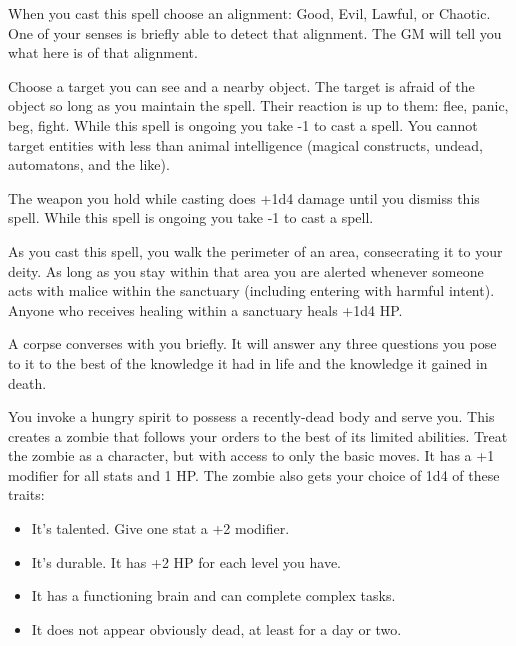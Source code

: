 
When you cast this spell choose an alignment: Good, Evil, Lawful, or Chaotic. One of your senses is briefly able to detect that alignment. The GM will tell you what here is of that alignment.

\newpage
{}


Choose a target you can see and a nearby object. The target is afraid of the object so long as you maintain the spell. Their reaction is up to them: flee, panic, beg, fight. While this spell is ongoing you take -1 to cast a spell. You cannot target entities with less than animal intelligence (magical constructs, undead, automatons, and the like).



The weapon you hold while casting does +1d4 damage until you dismiss this spell. While this spell is ongoing you take -1 to cast a spell.



As you cast this spell, you walk the perimeter of an area, consecrating it to your deity. As long as you stay within that area you are alerted whenever someone acts with malice within the sanctuary (including entering with harmful intent). Anyone who receives healing within a sanctuary heals +1d4 HP\@.



A corpse converses with you briefly. It will answer any three questions you pose to it to the best of the knowledge it had in life and the knowledge it gained in death.



You invoke a hungry spirit to possess a recently-dead body and serve you. This creates a zombie that follows your orders to the best of its limited abilities. Treat the zombie as a character, but with access to only the basic moves. It has a +1 modifier for all stats and 1 HP\@. The zombie also gets your choice of 1d4 of these traits:
\begin{itemize}
\item It's talented. Give one stat a +2 modifier.
\item It's durable. It has +2 HP for each level you have.
\item It has a functioning brain and can complete complex tasks.
\item It does not appear obviously dead, at least for a day or two.

\end{itemize}

